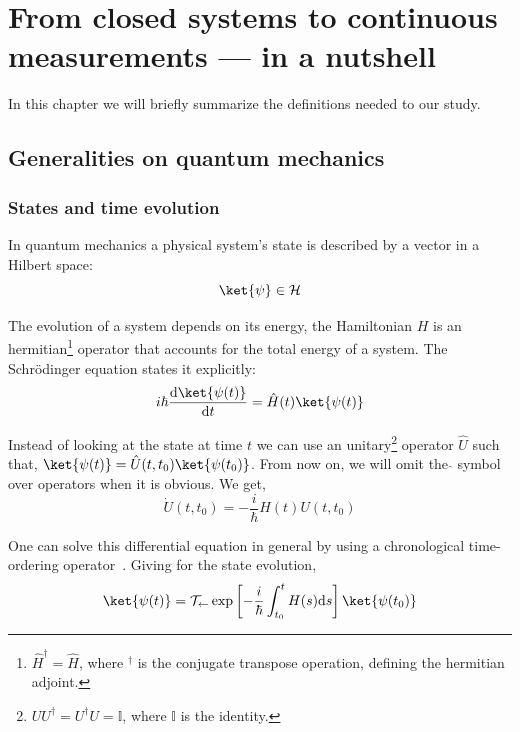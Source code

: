 \setlength{\parindent}{0pt}
\setlength{\parskip}{0pt}
\section[From closed systems to continuous measurements]{From closed systems to continuous measurements --- in a nutshell}
In this chapter we will briefly summarize the definitions needed to our study.
\subsection[Quantum mechanics]{Generalities on quantum mechanics}
\subsubsection{States and time evolution}\label{Ii1}
In quantum mechanics a physical system's state is described by a vector in a Hilbert space:
\begin{equation}
    \ket{\psi}\in\mathcal{H}
\end{equation}

The evolution of a system depends on its energy, the Hamiltonian $H$ is an hermitian\footnote{$\hat{H}^\dagger=\hat{H}$, where $^\dagger$ is the conjugate transpose operation, defining the hermitian adjoint. } operator that accounts for the total energy of a system. The Schrödinger equation states it explicitly: 
\begin{equation}
    i\hbar\frac{\mathrm{d}\ket{\psi(t)}}{\mathrm{d}t}=\hat{H}(t)\ket{\psi(t)}
\end{equation}

Instead of looking at the state at time $t$ we can use an unitary\footnote{$UU^\dagger=U^\dagger U=\mathbb{I}$, where $\mathbb{I}$ is the identity.} operator $\hat{U}$ such that, $\ket{\psi(t)}=\hat{U}(t,t_0)\ket{\psi(t_0)}$. From now on, we will omit the $\hat{}$ symbol over operators when it is obvious. We get, %
\begin{equation}
    \dot{U}(t,t_0)=-\frac{i}{\hbar}H(t)U(t,t_0)
\end{equation}

One can solve this differential equation in general by using a chronological time-ordering operator~\cite{Breuer}. Giving for the state evolution, %
\begin{equation}\label{Htimedep}
    \ket{\psi(t)} = \mathcal{T}_\leftarrow \exp\left[ -\frac{i}{\hbar}\int_{t_0}^t H(s) \mathrm{d}s\right]\ket{\psi(t_0)}
\end{equation}


